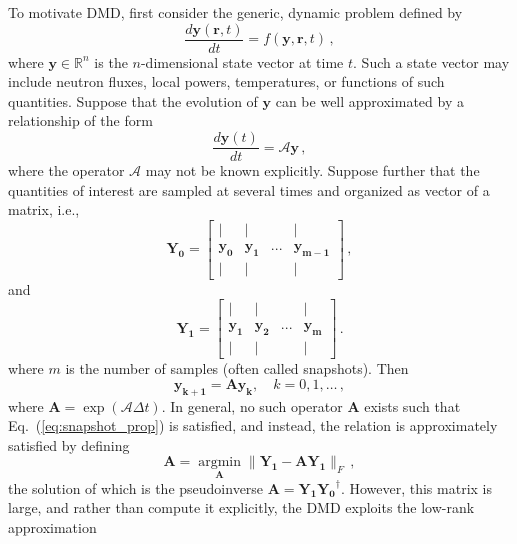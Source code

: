 \documentclass{anstrans}
\renewcommand{\vec}[1]{\bm{#1}} %
\DeclareMathOperator*{\argmin}{argmin}
\begin{document}
To motivate DMD, first consider the generic, dynamic problem defined by
\begin{equation}
  \frac{d{\vec{y} }(\vec{r},t)}{dt}=f(\vec{y},\vec{r},t) \, ,
\end{equation}
where ${\vec{y}} \in \mathbb{R}^{n}$ is the $n$-dimensional state vector at time $t$.  
Such a state vector may include neutron fluxes, local powers, temperatures, or functions of such quantities.
Suppose that the evolution of $\vec{y}$ can be well approximated by a relationship of the form  
\begin{equation}
 \frac{d{\vec{y}}(t)}{dt}=\mathcal{A}\vec{y} \, ,
\end{equation}
where the operator $\mathcal{A}$ may not be known explicitly. 
Suppose further that the quantities of interest are sampled at several times and organized as vector of a matrix, i.e.,
\begin{equation}
\mathbf{Y_0}=\left[\begin{array}{cccc}
| & | &   & | \\ 
{\vec{y_0}} &  {\vec{y_1}} & ... & {\vec{y_{m-1}}} \\ 
| & | &  & |
\end{array} \right]\, ,
\end{equation}
and
\begin{equation}
{\mathbf{Y_1}}=\left[\begin{array}{cccc}
| & | &  & | \\ 
{\vec{y_1}} &  {\vec{y_2}} & ... & {\vec{y_{m}}} \\ 
| & | &  & |
\end{array} \right] \, .
\end{equation}
where $m$ is the number of samples (often called snapshots).  
Then
\begin{equation}
  \vec{y_{k+1}}=\mathbf{A}\vec{y_{k}}, \quad k = 0, 1, \ldots \, ,
\label{eq:snapshot_prop}
\end{equation}
where $\mathbf{A}=\exp(\mathcal{A}\Delta t)$.  
In general, no such operator $\mathbf{A}$ exists such that Eq.~(\ref{eq:snapshot_prop}) is satisfied, and instead, the relation is approximately satisfied by defining
\begin{equation}
\label{eq:AOpt}
    \mathbf{A}=\argmin\limits_{\mathbf{A}}\|\mathbf{Y_{1}} -\mathbf{AY_{1}}\|_F \, ,
\end{equation}
the solution of which is the pseudoinverse $\mathbf{A}=\mathbf{Y_1}\mathbf{{{Y}_{0}}^{\dagger}}$.
However, this matrix is large, and rather than compute it explicitly, the DMD exploits the low-rank approximation
\end{document}

